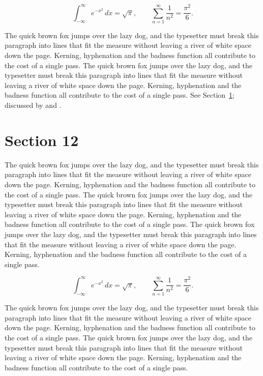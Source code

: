 \documentclass{article}
\begin{document}
\begin{equation}\label{eq:11}
\int_{-\infty}^{\infty} e^{-x^{2}}\,dx = \sqrt{\pi}, \qquad
\sum_{n=1}^{\infty} \frac{1}{n^{2}} = \frac{\pi^{2}}{6}.
\end{equation}

The quick brown fox jumps over the lazy dog, and the typesetter must break this paragraph into lines that fit the measure without leaving a river of white space down the page. Kerning, hyphenation and the badness function all contribute to the cost of a single pass. The quick brown fox jumps over the lazy dog, and the typesetter must break this paragraph into lines that fit the measure without leaving a river of white space down the page. Kerning, hyphenation and the badness function all contribute to the cost of a single pass. 
See Section~\ref{sec:12}; discussed by \textcite{k2} and \textcite{l4}.
\section{Section 12}
\label{sec:12}
The quick brown fox jumps over the lazy dog, and the typesetter must break this paragraph into lines that fit the measure without leaving a river of white space down the page. Kerning, hyphenation and the badness function all contribute to the cost of a single pass. The quick brown fox jumps over the lazy dog, and the typesetter must break this paragraph into lines that fit the measure without leaving a river of white space down the page. Kerning, hyphenation and the badness function all contribute to the cost of a single pass. The quick brown fox jumps over the lazy dog, and the typesetter must break this paragraph into lines that fit the measure without leaving a river of white space down the page. Kerning, hyphenation and the badness function all contribute to the cost of a single pass. 

\begin{equation}\label{eq:12}
\int_{-\infty}^{\infty} e^{-x^{2}}\,dx = \sqrt{\pi}, \qquad
\sum_{n=1}^{\infty} \frac{1}{n^{2}} = \frac{\pi^{2}}{6}.
\end{equation}

The quick brown fox jumps over the lazy dog, and the typesetter must break this paragraph into lines that fit the measure without leaving a river of white space down the page. Kerning, hyphenation and the badness function all contribute to the cost of a single pass. The quick brown fox jumps over the lazy dog, and the typesetter must break this paragraph into lines that fit the measure without leaving a river of white space down the page. Kerning, hyphenation and the badness function all contribute to the cost of a single pass. 
\end{document}
